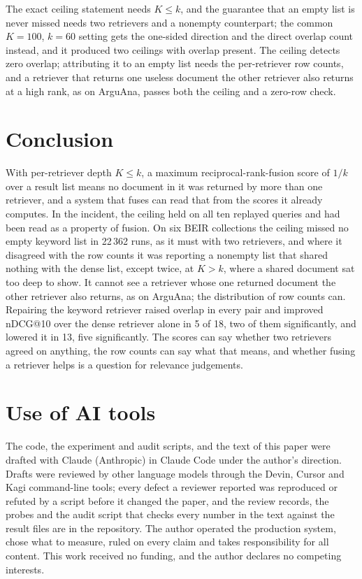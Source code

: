 \documentclass[11pt]{article}
\begin{document}
The exact ceiling statement needs $K \le k$, and the guarantee that an empty list is never missed needs two retrievers and a nonempty counterpart; the common $K = 100$, $k = 60$ setting gets the one-sided direction and the direct overlap count instead, and it produced two ceilings with overlap present. The ceiling detects zero overlap; attributing it to an empty list needs the per-retriever row counts, and a retriever that returns one useless document the other retriever also returns at a high rank, as on ArguAna, passes both the ceiling and a zero-row check.

\section{Conclusion}
\label{sec:conclusion}

With per-retriever depth $K \le k$, a maximum reciprocal-rank-fusion score of $1/k$ over a result list means no document in it was returned by more than one retriever, and a system that fuses can read that from the scores it already computes. In the incident, the ceiling held on all ten replayed queries and had been read as a property of fusion. On six BEIR collections the ceiling missed no empty keyword list in 22\,362 runs, as it must with two retrievers, and where it disagreed with the row counts it was reporting a nonempty list that shared nothing with the dense list, except twice, at $K > k$, where a shared document sat too deep to show. It cannot see a retriever whose one returned document the other retriever also returns, as on ArguAna; the distribution of row counts can. Repairing the keyword retriever raised overlap in every pair and improved nDCG@10 over the dense retriever alone in 5 of 18, two of them significantly, and lowered it in 13, five significantly. The scores can say whether two retrievers agreed on anything, the row counts can say what that means, and whether fusing a retriever helps is a question for relevance judgements.

\section*{Use of AI tools}

The code, the experiment and audit scripts, and the text of this paper were drafted with Claude (Anthropic) in Claude Code under the author's direction. Drafts were reviewed by other language models through the Devin, Cursor and Kagi command-line tools; every defect a reviewer reported was reproduced or refuted by a script before it changed the paper, and the review records, the probes and the audit script that checks every number in the text against the result files are in the repository. The author operated the production system, chose what to measure, ruled on every claim and takes responsibility for all content. This work received no funding, and the author declares no competing interests.
\end{document}
